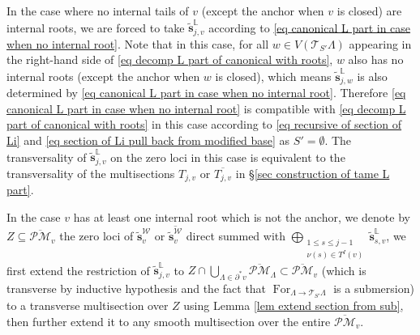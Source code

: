 \documentclass[11pt]{amsart}
\theoremstyle{definition}
\theoremstyle{remark}
\newcommand{\oPMb}{{\overline{\mathcal{PM}}}}
\newcommand{\<}{\left<}
\renewcommand{\>}{\right>}
\numberwithin{equation}{section}
\begin{document}
In the case where no internal tails of $v$ (except the anchor when $v$ is closed) are  internal roots, we are forced to take $ \tilde{\bm s}^{\mathbb L}_{j,v}$ according to \eqref{eq canonical L part in case when no internal root}.  Note that in this case,  for all $w\in V(\mathcal T_{S'}\Lambda)$ appearing in the right-hand side of \eqref{eq decomp L part of canonical with roots}, $w$ also has no internal roots (except the anchor when $w$ is closed), which means $ \tilde{\bm s}^{\mathbb L}_{j,w}$ is also determined by \eqref{eq canonical L part in case when no internal root}. Therefore   \eqref{eq canonical L part in case when no internal root} is compatible with \eqref{eq decomp L part of canonical with roots} in this case according to \eqref{eq recursive of section of Li} and \eqref{eq section of Li pull back from modified base} as $S'=\emptyset$. The transversality of $ \tilde{\bm s}^{\mathbb L}_{j,v}$ on the zero loci in this case is equivalent to the transversality of the multisections  $T_{j,v}$ or $\overline{T_{j,v}}$ in \S \ref{sec construction of tame L part}.

In the case $v$ has at least one internal root which is not the anchor, we denote by $Z\subseteq \oPMb_{v}$ the zero loci of $\tilde{\bm s}^{\mathcal W}_{v}$ or $\overline{\tilde{\bm s}^{\mathcal W}_{v}}$ direct summed with $\bigoplus_{\substack{1\le s \le j-1\\ \nu(s)\in T^I(v)}}\tilde{\bm{s}}^{\mathbb L}_{s,v}$,
we first extend the restriction of $ \tilde{\bm s}^{\mathbb L}_{j,v}$ to $Z \cap \bigcup_{\Lambda\in \partial^* v}\oPMb_{\Lambda}\subset \oPMb_{v}$ (which is transverse by inductive hypothesis and the fact that $\operatorname{For}_{\Lambda \to \mathcal T_{S'}\Lambda}$ is a submersion) to a transverse multisection over $Z$ using Lemma \ref{lem extend section from sub}, then further extend it to any smooth multisection over the entire $\oPMb_{v}$. 

\end{document}

